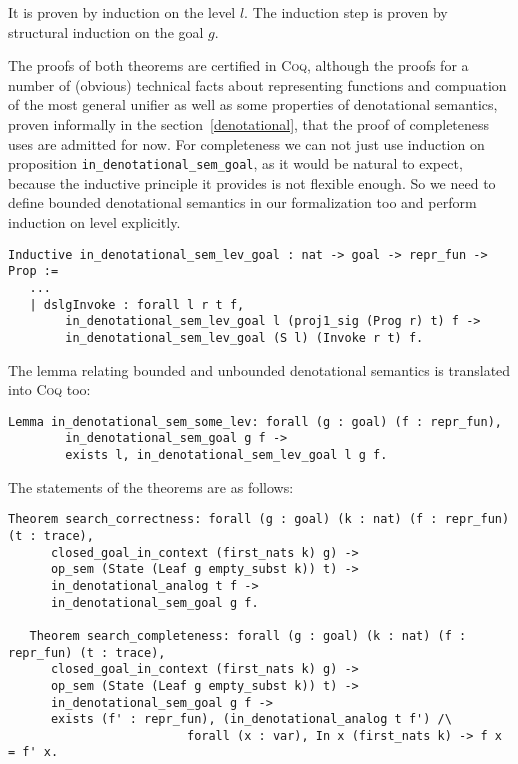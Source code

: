 It is proven by induction on the level $l$. The induction step is proven by structural induction on the goal $g$.

The proofs of both theorems are certified in \textsc{Coq}, although the proofs for a number of (obvious) technical facts about representing functions and compuation of the most general unifier as well as some properties of denotational semantics, proven informally in the section~\ref{denotational}, that the proof of completeness uses are admitted for now. For completeness we can not just use induction on proposition \lstinline|in_denotational_sem_goal|, as it would be natural to expect, because the inductive principle it provides is not flexible enough. So we need to define bounded denotational semantics in our formalization too and perform induction on level explicitly.

\begin{lstlisting}[language=Coq]
   Inductive in_denotational_sem_lev_goal : nat -> goal -> repr_fun -> Prop :=
   ...
   | dslgInvoke : forall l r t f,
        in_denotational_sem_lev_goal l (proj1_sig (Prog r) t) f ->
        in_denotational_sem_lev_goal (S l) (Invoke r t) f.
\end{lstlisting}

The lemma relating bounded and unbounded denotational semantics is translated into \textsc{Coq} too:

\begin{lstlisting}[language=Coq]
   Lemma in_denotational_sem_some_lev: forall (g : goal) (f : repr_fun),
        in_denotational_sem_goal g f ->
        exists l, in_denotational_sem_lev_goal l g f.
\end{lstlisting}

The statements of the theorems are as follows:

\begin{lstlisting}[language=Coq]
   Theorem search_correctness: forall (g : goal) (k : nat) (f : repr_fun) (t : trace),
      closed_goal_in_context (first_nats k) g) ->
      op_sem (State (Leaf g empty_subst k)) t) ->
      in_denotational_analog t f ->
      in_denotational_sem_goal g f.
      
   Theorem search_completeness: forall (g : goal) (k : nat) (f : repr_fun) (t : trace),
      closed_goal_in_context (first_nats k) g) ->
      op_sem (State (Leaf g empty_subst k)) t) ->
      in_denotational_sem_goal g f ->
      exists (f' : repr_fun), (in_denotational_analog t f') /\
                         forall (x : var), In x (first_nats k) -> f x = f' x.
\end{lstlisting}

